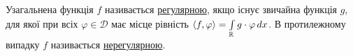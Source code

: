 \begin{theory}
    Узагальнена функція $f$ називається \ul{регулярною}, якщо існує звичайна
    функція $g$, для якої при всіх $\varphi \in \mathcal{D}$ має місце
    рівність $\left\langle f, \varphi\right\rangle = \int\limits_{\mathbb{R}}^{} g\cdot \varphi \,dx$.
    В протилежному випадку $f$ називається \ul{нерегулярною}.
\end{theory}